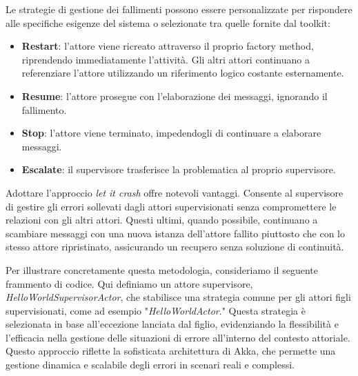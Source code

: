 Le strategie di gestione dei fallimenti possono essere personalizzate per rispondere alle specifiche esigenze del sistema o selezionate tra quelle fornite dal toolkit:
\begin{itemize}
  \item \textbf{Restart}: l'attore viene ricreato attraverso il proprio factory method, riprendendo immediatamente l'attività. Gli altri attori continuano a referenziare l'attore utilizzando un riferimento logico costante esternamente.
  \item \textbf{Resume}: l'attore prosegue con l'elaborazione dei messaggi, ignorando il fallimento.
  \item \textbf{Stop}: l'attore viene terminato, impedendogli di continuare a elaborare messaggi.
  \item \textbf{Escalate}: il supervisore trasferisce la problematica al proprio supervisore.
\end{itemize}
Adottare l'approccio \textit{let it crash} offre notevoli vantaggi.
Consente al supervisore di gestire gli errori sollevati dagli attori supervisionati senza compromettere le relazioni con gli altri attori.
Questi ultimi, quando possibile, continuano a scambiare messaggi con una nuova istanza dell'attore fallito piuttosto che con lo stesso attore ripristinato, assicurando un recupero senza soluzione di continuità. 

Per illustrare concretamente questa metodologia, consideriamo il seguente frammento di codice.
Qui definiamo un attore supervisore, \textit{HelloWorldSupervisorActor}, che stabilisce una strategia comune per gli attori figli supervisionati, come ad esempio "\textit{HelloWorldActor}."
Questa strategia è selezionata in base all'eccezione lanciata dal figlio, evidenziando la flessibilità e l'efficacia nella gestione delle situazioni di errore all'interno del contesto attoriale.
Questo approccio riflette la sofisticata architettura di Akka, che permette una gestione dinamica e scalabile degli errori in scenari reali e complessi.

 

